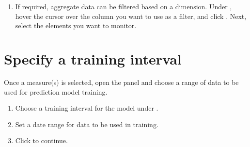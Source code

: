 \documentclass[letterpaper,10pt,english]{sphinxmanual}
\begin{document}
\begin{enumerate}
\begin{quote}
\begin{figure}[H]
\centering

\noindent{}
\end{figure}
\end{quote}

\item {} 
If required, aggregate data can be filtered based on a dimension. Under , hover the cursor over the column you want to use as a filter, and click . Next, select the elements you want to monitor.
\begin{quote}

\begin{figure}[H]
\centering

\noindent{}
\end{figure}
\end{quote}

\end{enumerate}


\section{Specify a training interval}
\label{\detokenize{anomaly/part02/index:configure-training}}\label{\detokenize{anomaly/part02/index:id4}}
Once a measure(s) is selected, open the  panel and choose a range of data to be used for prediction model training.
\begin{enumerate}
\def\theenumi{\arabic{enumi}}
\def\labelenumi{\theenumi .}
\makeatletter\def\p@enumii{\p@enumi \theenumi .}\makeatother
\item {} 
Choose a training interval for the model under .
\begin{quote}

\begin{figure}[H]
\centering

\noindent{}
\end{figure}
\end{quote}

\item {} 
Set a date range for data to be used in training.
\begin{quote}

\begin{figure}[H]
\centering

\noindent{}
\end{figure}
\end{quote}

\item {} 
Click  to continue.

\end{enumerate}
\end{document}
